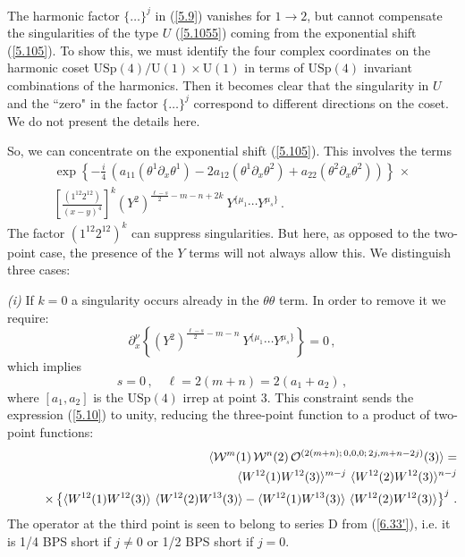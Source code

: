 \documentclass[a4paper,11pt]{article}
\begin{document}
The harmonic factor $\{ \ldots \}^j$ in (\ref{5.9}) vanishes for $1 \rightarrow
2$, but cannot compensate the singularities of the type $U$ (\ref{5.1055})
coming from the exponential shift (\ref{5.105}). To show this, we must
identify the four complex coordinates on the harmonic coset
${\mbox{USp}}(4)/\mbox{U}(1)\times \mbox{U}(1)$ in terms of ${\mbox{USp}}(4)$
invariant combinations of the harmonics. Then it becomes clear that the
singularity in $U$ and the ``zero" in the factor $\{ \ldots \}^j$ correspond to
different directions on the coset. We do not present the details here.

So, we can concentrate on the exponential shift (\ref{5.105}). This involves
the terms
\begin{eqnarray} \label{5.10}
\exp\left\{ - \frac{i}{4} \, \left( a_{11}
  (\theta^1 \partial_x \theta^1) - 2 a_{12} (\theta^1 \partial_x \theta^2) +
a_{22} (\theta^2 \partial_x \theta^2) \right) \right\} \, \times \\
\left[ \frac{(1^{12}2^{12})}{(x-y)^4} \right]^k
(Y^2)^{\frac{\ell-s}{2}-m-n+2k}\ Y^{\{\mu_1}\cdots
  Y^{\mu_s\}} \, . \nonumber
\end{eqnarray}
The factor $(1^{12}2^{12})^k$ can suppress singularities. But
here, as opposed to the two-point case, the presence of the $Y$
terms will not always allow this. We distinguish three cases:

{\it (i)}  If $k=0$ a singularity occurs already in the $\theta \theta$ term.
In order to remove it we require:
\begin{equation}\label{5.14}
  \partial^\nu_x \left\{(Y^2)^{\frac{\ell-s}{2}-m-n}\ Y^{\{\mu_1}\cdots
  Y^{\mu_s\}} \right\} = 0 \, ,
\end{equation}
which implies
\begin{equation}\label{5.15}
  s=0\,, \quad \ell = 2(m+n) = 2(a_1+a_2) \, ,
\end{equation}
where $[a_1,a_2]$ is the $\mbox{USp}(4)$ irrep at point 3. This constraint
sends the expression (\ref{5.10}) to unity, reducing the three-point function
to a product of two-point functions:
\begin{eqnarray}
  && \langle {\cal W}^m(1) \,
  {\cal W}^n(2) \,
  {\cal O}^{(2(m+n); \, 0, 0, 0; \, 2j, m+n-2j)}(3)\rangle = \label{5.1400} \\
  &&\qquad \langle W^{12}(1) W^{12}(3) \rangle^{m-j} \
  \langle W^{12}(2) W^{12}(3) \rangle^{n-j} \nonumber\\
  &&\qquad \times \left\{\langle W^{12}(1) W^{12}(3) \rangle
  \ \langle W^{12}(2) W^{13}(3) \rangle -
  \langle W^{12}(1) W^{13}(3) \rangle
  \ \langle W^{12}(2) W^{12}(3) \rangle
    \right\}^j  \,. \nonumber
\end{eqnarray}
The operator at the third point is seen to belong to series D from
(\ref{6.33'}), i.e. it is 1/4 BPS short if $j\neq 0$ or 1/2 BPS short if
$j=0$.
\end{document}

